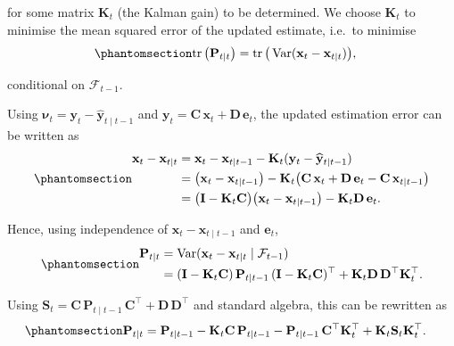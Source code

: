 \documentclass[
  letterpaper,
  DIV=11,
  numbers=noendperiod]{scrreprt}
\begin{document}
for some matrix \(\mathbf{K}_t\) (the Kalman gain) to be determined. We
choose \(\mathbf{K}_t\) to minimise the mean squared error of the
updated estimate, i.e.~to minimise
\begin{equation}\protect\phantomsection\label{eq-gen-0118}{
\begin{align}
  \operatorname{tr}\big(\mathbf{P}_{t\mid t}\big)
    &= \operatorname{tr}\big(\operatorname{Var}(\mathbf{x}_t - \mathbf{x}_{t\mid t})\big),
\end{align}
}\end{equation}

conditional on \(\mathcal{F}_{t-1}\).

Using
\(\boldsymbol{\nu}_t = \mathbf{y}_t - \widehat{\mathbf{y}}_{t\mid t-1}\)
and
\(\mathbf{y}_t = \mathbf{C}\,\mathbf{x}_t + \mathbf{D}\,\mathbf{e}_t\),
the updated estimation error can be written as
\begin{equation}\protect\phantomsection\label{eq-gen-0119}{
\begin{align}
  \mathbf{x}_t - \mathbf{x}_{t\mid t}
   &= \mathbf{x}_t - \mathbf{x}_{t\mid t-1}
      - \mathbf{K}_t (\mathbf{y}_t - \widehat{\mathbf{y}}_{t\mid t-1}) \\
   &= \big(\mathbf{x}_t - \mathbf{x}_{t\mid t-1}\big)
      - \mathbf{K}_t \big(\mathbf{C}\,\mathbf{x}_t + \mathbf{D}\,\mathbf{e}_t
                           - \mathbf{C}\,\mathbf{x}_{t\mid t-1}\big) \\
   &= \big(\mathbf{I} - \mathbf{K}_t \mathbf{C}\big)
       \big(\mathbf{x}_t - \mathbf{x}_{t\mid t-1}\big)
      - \mathbf{K}_t \mathbf{D}\,\mathbf{e}_t.
\end{align}
}\end{equation}

Hence, using independence of \(\mathbf{x}_t - \mathbf{x}_{t\mid t-1}\)
and \(\mathbf{e}_t\),
\begin{equation}\protect\phantomsection\label{eq-gen-0120}{
\begin{align}
  \mathbf{P}_{t\mid t}
  &= \operatorname{Var}(\mathbf{x}_t - \mathbf{x}_{t\mid t} \mid \mathcal{F}_{t-1}) \\
  &= (\mathbf{I} - \mathbf{K}_t \mathbf{C})\,\mathbf{P}_{t\mid t-1}\,
        (\mathbf{I} - \mathbf{K}_t \mathbf{C})^\top
     + \mathbf{K}_t \mathbf{D}\,\mathbf{D}^\top \mathbf{K}_t^\top.
\end{align}
}\end{equation}

Using
\(\mathbf{S}_t = \mathbf{C}\,\mathbf{P}_{t\mid t-1}\,\mathbf{C}^\top
+ \mathbf{D}\,\mathbf{D}^\top\) and standard algebra, this can be
rewritten as \begin{equation}\protect\phantomsection\label{eq-Ptt}{
\begin{align}
  \mathbf{P}_{t\mid t}
    &= \mathbf{P}_{t\mid t-1}
       - \mathbf{K}_t \mathbf{C}\,\mathbf{P}_{t\mid t-1}
       - \mathbf{P}_{t\mid t-1}\,\mathbf{C}^\top \mathbf{K}_t^\top
       + \mathbf{K}_t \mathbf{S}_t \mathbf{K}_t^\top.
\end{align}
}\end{equation}
\end{document}
